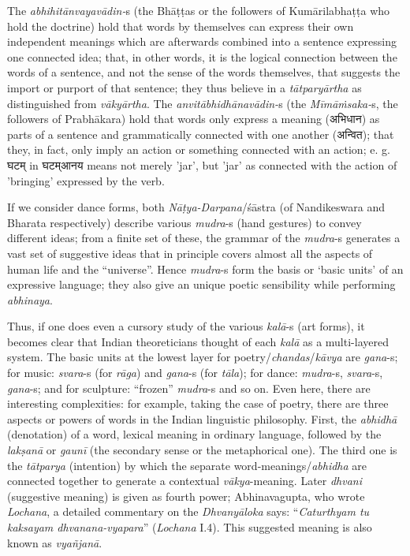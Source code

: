\begin{myquote}
The \textsl{abhihitānvayavādin-}s (the Bhāṭṭas or the followers of Kumārilabhaṭṭa who hold the doctrine) hold that words by themselves can express their own independent meanings which are afterwards combined into a sentence expressing one connected idea; that, in other words, it is the logical connection between the words of a sentence, and not the sense of the words themselves, that suggests the import or purport of that sentence; they thus believe in a \textsl{tātparyārtha} as distinguished from \textsl{vākyārtha}. The \textsl{anvitābhidhānavādin-}s (the \textsl{Mīmāṁsaka-}s, the followers of Prabhākara) hold that words only express a meaning ({\dev अभिधान}) as parts of a sentence and grammatically connected with one another ({\dev अन्वित}); that they, in fact, only imply an action or something connected with an action; e. g. {\dev घटम्} in {\dev घटम्आनय} means not merely 'jar', but 'jar' as connected with the action of 'bringing' expressed by the verb.
\end{myquote}

If we consider dance forms, both \textsl{Nāṭya-Darpana}/śāstra (of Nandikeswara and Bharata respectively) describe various \textsl{mudra}-s (hand gestures) to convey different ideas; from a finite set of these, the grammar of the \textsl{mudra}-s generates a vast set of suggestive ideas that in principle covers almost all the aspects of human life and the “universe”. Hence \textsl{mudra}-s form the basis or ‘basic units’ of an expressive language; they also give an unique poetic sensibility while performing \textsl{abhinaya}.

Thus, if one does even a cursory study of the various \textsl{kalā}-s (art forms), it becomes clear that Indian theoreticians thought of each \textsl{kalā} as a multi-layered system. The basic units at the lowest layer for poetry/\textsl{chandas}/\textsl{kāvya} are \textsl{gana}-s; for music: \textsl{svara}-s (for \textsl{rāga}) and \textsl{gana}-s (for \textsl{tāla}); for dance: \textsl{mudra}-s, \textsl{svara}-s, \textsl{gana}-s; and for sculpture: “frozen” \textsl{mudra}-s and so on. Even here, there are interesting complexities: for example, taking the case of poetry, there are three aspects or powers of words in the Indian linguistic philosophy. First, the \textsl{abhidhā} (denotation) of a word, lexical meaning in ordinary language, followed by the \textsl{lakṣanā} or \textsl{gaunī} (the secondary sense or the metaphorical one). The third one is the \textsl{tātparya} (intention) by which the separate word-meanings/\textsl{abhidha} are connected together to generate a contextual \textsl{vākya}-meaning. Later \textsl{dhvani} (suggestive meaning) is given as fourth power; Abhinavagupta, who wrote \textsl{Lochana}, a detailed commentary on the \textsl{Dhvanyāloka} says: “\textsl{Caturthyam tu kaksayam dhvanana-vyapara}” (\textsl{Lochana} I.4). This suggested meaning is also known as \textsl{vyañjanā}.

